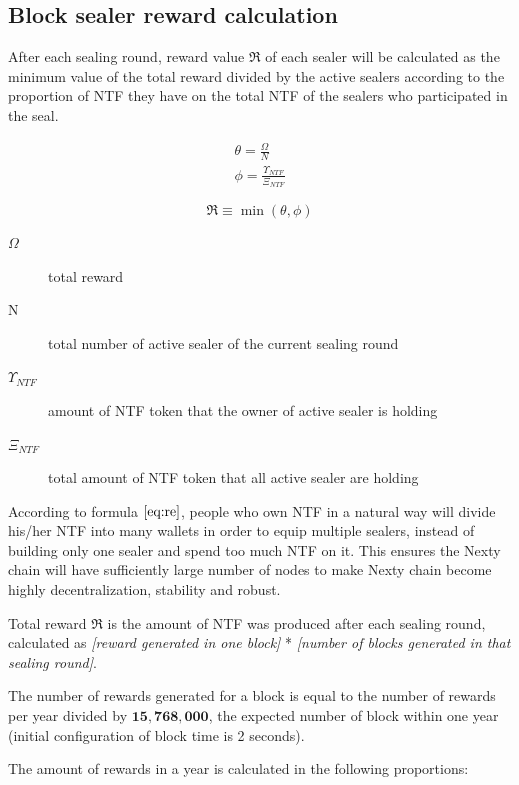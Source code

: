 \documentclass[12pt,oneside]{amsart}
\begin{document}
\begin{multicols}{2}
\section{Block sealer reward calculation}

After each sealing round, reward value $\Re$ of each sealer will be calculated as the minimum value of the total reward divided by the active sealers according to the proportion of {\small NTF} they have on the total {\small NTF} of the sealers who participated in the seal.
  
\begin{eqnarray}
\theta = \frac{\Omega}{N} \\
\phi = \frac{\Upsilon_{NTF}}{\Xi_{NTF}}
\end{eqnarray}

\begin{equation}\label{eq:re}
\Re \equiv \min(\theta, \phi)
\end{equation}

\begin{description}
\item[$\Omega$] total reward
\item[N] total number of active sealer of the current sealing round
\item[$\Upsilon_{NTF}$] amount of NTF token that the owner of active sealer is holding
\item[$\Xi_{NTF}$] total amount of NTF token that all active sealer are holding
\end{description}

According to formula $\eqref{eq:re}$, people who own {\small NTF} in a natural way will divide his/her {\small NTF} into many wallets in order to equip multiple sealers, instead of building only one sealer and spend too much  {\small NTF} on it. This ensures the Nexty chain will have sufficiently large number of nodes to make Nexty chain become highly decentralization, stability and robust.

Total reward $\Re$ is the amount of {\small NTF} was produced after each sealing round, calculated as \textit{[reward generated in one block]} * \textit{[number of blocks generated in that sealing round]}.

The number of rewards generated for a block is equal to the number of rewards per year divided by $\mathbf{15,768,000}$, the expected number of block within one year (initial configuration of block time is 2 seconds).
 
The amount of rewards in a year is calculated in the following proportions:


\end{multicols}
\end{document}
